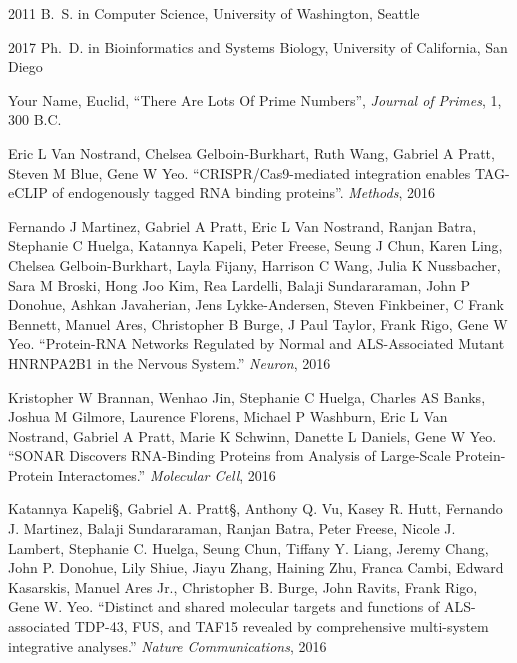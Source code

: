 \begin{frontmatter}
%
%
\begin{vitapage}
\begin{vita}
  \item[2011] B.~S. in Computer Science, University of Washington, Seattle
  \item[2017] Ph.~D. in Bioinformatics and Systems Biology, University of California, San Diego
\end{vita}
\begin{publications}
    \item Your Name, Euclid, ``There Are Lots Of Prime Numbers'', \emph{Journal of Primes}, 1, 300 B.C.
  \item Eric L Van Nostrand, Chelsea Gelboin-Burkhart, Ruth Wang, Gabriel A Pratt, Steven M Blue, Gene W Yeo. ``CRISPR/Cas9-mediated integration enables TAG-eCLIP of endogenously tagged RNA binding proteins''. \emph{Methods}, 2016
      \item Fernando J Martinez, Gabriel A Pratt, Eric L Van Nostrand, Ranjan Batra, Stephanie C Huelga, Katannya Kapeli, Peter Freese, Seung J Chun, Karen Ling, Chelsea Gelboin-Burkhart, Layla Fijany, Harrison C Wang, Julia K Nussbacher, Sara M Broski, Hong Joo Kim, Rea Lardelli, Balaji Sundararaman, John P Donohue, Ashkan Javaherian, Jens Lykke-Andersen, Steven Finkbeiner, C Frank Bennett, Manuel Ares, Christopher B Burge, J Paul Taylor, Frank Rigo, Gene W Yeo. ``Protein-RNA Networks Regulated by Normal and ALS-Associated Mutant HNRNPA2B1 in the Nervous System.'' \emph{Neuron}, 2016
      \item Kristopher W Brannan, Wenhao Jin, Stephanie C Huelga, Charles AS Banks, Joshua M Gilmore, Laurence Florens, Michael P Washburn, Eric L Van Nostrand, Gabriel A Pratt, Marie K Schwinn, Danette L Daniels, Gene W Yeo. ``SONAR Discovers RNA-Binding Proteins from Analysis of Large-Scale Protein-Protein Interactomes.'' \emph{Molecular Cell}, 2016
      \item Katannya Kapeli§, Gabriel A. Pratt§, Anthony Q. Vu, Kasey R. Hutt, Fernando J. Martinez, Balaji Sundararaman, Ranjan Batra, Peter Freese, Nicole J. Lambert, Stephanie C. Huelga, Seung Chun, Tiffany Y. Liang, Jeremy Chang, John P. Donohue, Lily Shiue, Jiayu Zhang, Haining Zhu, Franca Cambi, Edward Kasarskis, Manuel Ares Jr., Christopher B. Burge, John Ravits, Frank Rigo, Gene W. Yeo. ``Distinct and shared molecular targets and functions of ALS-associated TDP-43, FUS, and TAF15 revealed by comprehensive multi-system integrative analyses.'' \emph{Nature Communications}, 2016

\end{publications}
\end{vitapage}
\end{frontmatter}
